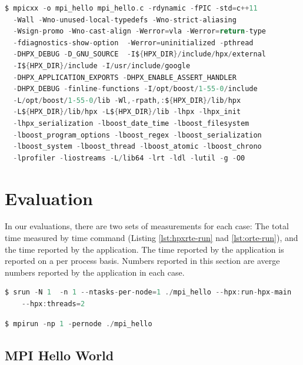 \begin{lstlisting}[language=C, frame=single, basicstyle=\footnotesize, caption=Compile Line for Hello World\label{lst:compile}]
  $ mpicxx -o mpi_hello mpi_hello.c -rdynamic -fPIC -std=c++11
  -Wall -Wno-unused-local-typedefs -Wno-strict-aliasing
  -Wsign-promo -Wno-cast-align -Werror=vla -Werror=return-type
  -fdiagnostics-show-option  -Werror=uninitialized -pthread
  -DHPX_DEBUG -D_GNU_SOURCE  -I${HPX_DIR}/include/hpx/external
  -I${HPX_DIR}/include -I/usr/include/google
  -DHPX_APPLICATION_EXPORTS -DHPX_ENABLE_ASSERT_HANDLER
  -DHPX_DEBUG -finline-functions -I/opt/boost/1-55-0/include
  -L/opt/boost/1-55-0/lib -Wl,-rpath,:${HPX_DIR}/lib/hpx
  -L${HPX_DIR}/lib/hpx -L${HPX_DIR}/lib -lhpx -lhpx_init
  -lhpx_serialization -lboost_date_time -lboost_filesystem
  -lboost_program_options -lboost_regex -lboost_serialization
  -lboost_system -lboost_thread -lboost_atomic -lboost_chrono
  -lprofiler -liostreams -L/lib64 -lrt -ldl -lutil -g -O0
\end{lstlisting}


\section{Evaluation}

In our evaluations, there are two sets of measurements for each case: The total time measured by time command (Listing \ref{lst:hpxrte-run} nad \ref{lst:orte-run}), and the time reported by the application. The time reported by the application is reported on a per process basis. Numbers reported in this section are averge numbers reported by the application in each case.

\begin{lstlisting}[language=C, frame=single, basicstyle=\footnotesize, caption=Running MPI Applications Using HPX-RTE \label{lst:hpxrte-run}]
  $ srun -N 1  -n 1 --ntasks-per-node=1 ./mpi_hello --hpx:run-hpx-main
    --hpx:threads=2
\end{lstlisting}

\begin{lstlisting}[language=C, frame=single, basicstyle=\footnotesize, caption=Running MPI Applications Using ORTE \label{lst:orte-run}]
$ mpirun -np 1 -pernode ./mpi_hello
\end{lstlisting}


\subsection{MPI Hello World}

